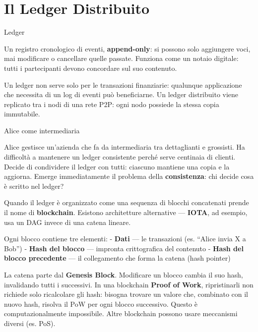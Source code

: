 \documentclass[
  italian,
  openany]{book}
\begin{document}
\section{Il Ledger Distribuito}\label{il-ledger-distribuito}

\begin{calloutdefinition}{Ledger}

Un registro cronologico di eventi, \textbf{append-only}: si possono solo
aggiungere voci, mai modificare o cancellare quelle passate. Funziona
come un notaio digitale: tutti i partecipanti devono concordare sul suo
contenuto.

\end{calloutdefinition}

Un ledger non serve solo per le transazioni finanziarie: qualunque
applicazione che necessita di un log di eventi può beneficiarne. Un
ledger distribuito viene replicato tra i nodi di una rete P2P: ogni nodo
possiede la stessa copia immutabile.

\begin{callouttip}{Alice come intermediaria}

Alice gestisce un'azienda che fa da intermediaria tra dettaglianti e
grossisti. Ha difficoltà a mantenere un ledger consistente perché serve
centinaia di clienti. Decide di condividere il ledger con tutti:
ciascuno mantiene una copia e la aggiorna. Emerge immediatamente il
problema della \textbf{consistenza}: chi decide cosa è scritto nel
ledger?

\end{callouttip}

Quando il ledger è organizzato come una sequenza di blocchi concatenati
prende il nome di \textbf{blockchain}. Esistono architetture alternative
--- \textbf{IOTA}, ad esempio, usa un DAG invece di una catena lineare.

Ogni blocco contiene tre elementi: - \textbf{Dati} --- le transazioni
(es. ``Alice invia X a Bob'') - \textbf{Hash del blocco} --- impronta
crittografica del contenuto - \textbf{Hash del blocco precedente} --- il
collegamento che forma la catena (hash pointer)

La catena parte dal \textbf{Genesis Block}. Modificare un blocco cambia
il suo hash, invalidando tutti i successivi. In una blockchain
\textbf{Proof of Work}, ripristinarli non richiede solo ricalcolare gli
hash: bisogna trovare un valore che, combinato con il nuovo hash,
risolva il PoW per ogni blocco successivo. Questo è computazionalmente
impossibile. Altre blockchain possono usare meccanismi diversi (es.
PoS).
\end{document}
